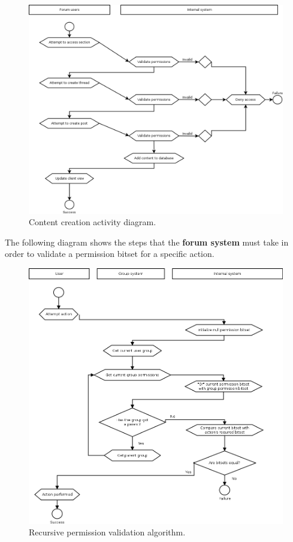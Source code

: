 \documentclass[12pt]{report}
\renewcommand\emph{\textbf}
\begin{document}
                    \begin{figure}[H]
                    \caption{Content creation activity diagram.}
                    \centering
                    \includegraphics[width=1\textwidth]{uc/a2}
                    \end{figure}

                    \newpage

                    The following diagram shows the steps that the \emph{forum system} must take in order to validate a permission bitset for a specific action.

                    \begin{figure}[H]
                    \caption{Recursive permission validation algorithm.}
                    \centering
                    \includegraphics[width=1\textwidth]{dn/0}
                    \end{figure}
\end{document}
